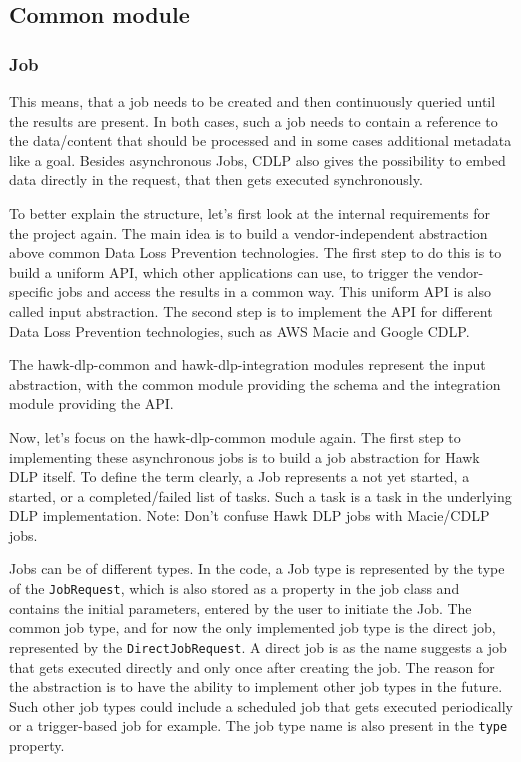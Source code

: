 \subsection{Common module}


\subsubsection{Job}
This means, that a job needs to be created and then continuously queried until the results are present. In both cases, such a job needs to contain a reference to the data/content that should be processed and in some cases additional metadata like a goal. Besides asynchronous Jobs,
CDLP also gives the possibility to embed data directly in the request, that then gets executed synchronously.

To better explain the structure, let's first look at the internal requirements for the project again. The main idea is to build a vendor-independent abstraction above common Data Loss Prevention technologies. The first step to do this is to build a uniform API, which other applications can use, to trigger the vendor-specific jobs and access the results in a common way. This uniform API is also called input abstraction. The second step is to implement the API for different Data Loss Prevention technologies, such as AWS Macie and Google CDLP.

The hawk-dlp-common and hawk-dlp-integration modules represent the input abstraction, with the common module providing the schema and the integration module providing the API.

Now, let's focus on the hawk-dlp-common module again. The first step to implementing these asynchronous jobs is to build a job abstraction for Hawk DLP itself. To define the term clearly, a Job represents a not yet started, a started, or a completed/failed list of tasks. Such a task is a task in the underlying DLP implementation. Note: Don't confuse Hawk DLP jobs with Macie/CDLP jobs.

Jobs can be of different types. In the code, a Job type is represented by the type of the \texttt{JobRequest}, which is also stored as a property in the job class and contains the initial parameters, entered by the user to initiate the Job. The common job type, and for now the only implemented job type is the direct job, represented by the \texttt{DirectJobRequest}. A direct job is as the name suggests a job that gets executed directly and only once after creating the job. The reason for the abstraction is to have the ability to implement other job types in the future. Such other job types could include a scheduled job that gets executed periodically or a trigger-based job for example. The job type name is also present in the \texttt{type} property.

